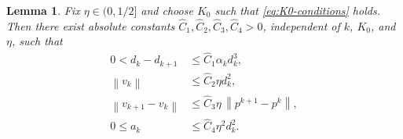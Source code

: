 \documentclass[10pt,a4paper]{amsart}
\newtheorem{lemma}{Lemma}
\newcommand{\norm}[1]{\left\lVert #1\right\rVert}
\begin{document}
\begin{lemma}
\label{lem:elementary}
Fix \(\eta\in(0,1/2]\) and choose \(K_0\) such that
\eqref{eq:K0-conditions} holds. Then there exist absolute constants
\(\widehat C_1,\widehat C_2,\widehat C_3,\widehat C_4>0\), independent
of \(k\), \(K_0\), and \(\eta\), such that
\begin{align}
    0<d_k-d_{k+1}
    &\leq \widehat C_1\alpha_kd_k^3,
    \label{eq:d-first}\\
    \norm{v_k}
    &\leq \widehat C_2\eta d_k^2,
    \label{eq:v-size}\\
    \norm{v_{k+1}-v_k}
    &\leq \widehat C_3\eta\,\norm{p^{k+1}-p^k},
    \label{eq:v-consecutive}\\
    0\leq a_k
    &\leq \widehat C_4\eta^2d_k^2.
    \label{eq:a-size}
\end{align}
\end{lemma}
\end{document}
